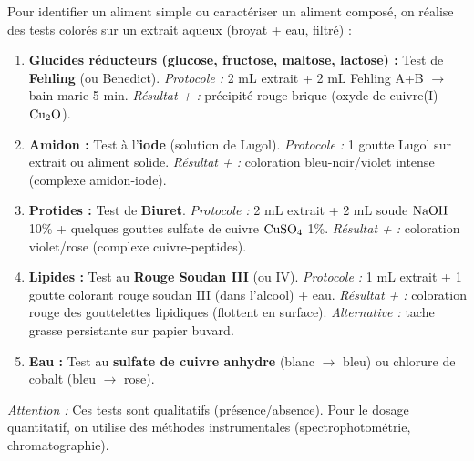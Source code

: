 \documentclass[11pt]{article}
\begin{document}
\begin{methode}
Pour identifier un aliment simple ou caractériser un aliment composé, on réalise des tests colorés sur un extrait aqueux (broyat + eau, filtré) :
\begin{enumerate}
\item \textbf{Glucides réducteurs (glucose, fructose, maltose, lactose) :} Test de \textbf{Fehling} (ou Benedict). \textit{Protocole :} 2 mL extrait + 2 mL Fehling A+B $\rightarrow$ bain-marie 5 min. \textit{Résultat + :} précipité rouge brique (oxyde de cuivre(I) $\ce{Cu2O}$).
\item \textbf{Amidon :} Test à l'\textbf{iode} (solution de Lugol). \textit{Protocole :} 1 goutte Lugol sur extrait ou aliment solide. \textit{Résultat + :} coloration bleu-noir/violet intense (complexe amidon-iode).
\item \textbf{Protides :} Test de \textbf{Biuret}. \textit{Protocole :} 2 mL extrait + 2 mL soude $\ce{NaOH}$ 10\% + quelques gouttes sulfate de cuivre $\ce{CuSO4}$ 1\%. \textit{Résultat + :} coloration violet/rose (complexe cuivre-peptides).
\item \textbf{Lipides :} Test au \textbf{Rouge Soudan III} (ou IV). \textit{Protocole :} 1 mL extrait + 1 goutte colorant rouge soudan III (dans l'alcool) + eau. \textit{Résultat + :} coloration rouge des gouttelettes lipidiques (flottent en surface). \textit{Alternative :} tache grasse persistante sur papier buvard.
\item \textbf{Eau :} Test au \textbf{sulfate de cuivre anhydre} (blanc $\rightarrow$ bleu) ou chlorure de cobalt (bleu $\rightarrow$ rose).
\end{enumerate}
\emph{Attention :} Ces tests sont qualitatifs (présence/absence). Pour le dosage quantitatif, on utilise des méthodes instrumentales (spectrophotométrie, chromatographie).
\end{methode}
\end{document}
